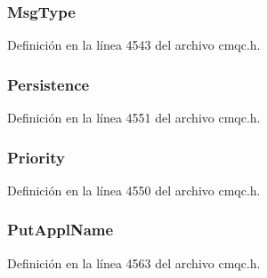 \hypertarget{structtag_m_q_m_d1_a22732037d5385ab03eb3e9d9a5e60843}{}
\subsubsection[{Msg\+Type}]{ Msg\+Type}\label{structtag_m_q_m_d1_a22732037d5385ab03eb3e9d9a5e60843}


Definición en la línea 4543 del archivo cmqc.\+h.

\hypertarget{structtag_m_q_m_d1_af0f253d60fa2dcbe2bda530c88661853}{}
\subsubsection[{Persistence}]{ Persistence}\label{structtag_m_q_m_d1_af0f253d60fa2dcbe2bda530c88661853}


Definición en la línea 4551 del archivo cmqc.\+h.

\hypertarget{structtag_m_q_m_d1_a72c542b9e2952a489df0cb84755c1fa6}{}
\subsubsection[{Priority}]{ Priority}\label{structtag_m_q_m_d1_a72c542b9e2952a489df0cb84755c1fa6}


Definición en la línea 4550 del archivo cmqc.\+h.

\hypertarget{structtag_m_q_m_d1_a7195390be27f384ef0ab0d0f9053d462}{}
\subsubsection[{Put\+Appl\+Name}]{ Put\+Appl\+Name}\label{structtag_m_q_m_d1_a7195390be27f384ef0ab0d0f9053d462}


Definición en la línea 4563 del archivo cmqc.\+h.

